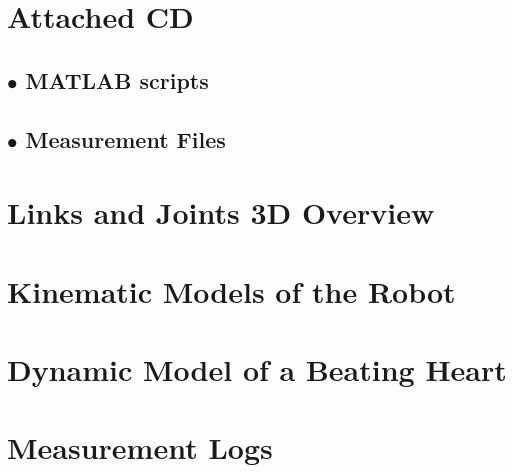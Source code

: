 \begin{appendices}
\appendix
\renewcommand{\appendixname}{Appendix}
\renewcommand{\appendixtocname}{Appendix}

\chapter{Attached CD}\label{app:cd}
   \section*{$\bullet$ MATLAB scripts}
   \section*{$\bullet$ Measurement Files}



\chapter{Links and Joints 3D Overview}\label{app:links_joints_3d}


\chapter{Kinematic Models of the Robot}\label{app:kinematic_model_robot}


\chapter{Dynamic Model of a Beating Heart}\label{app:dynamic_model_heart}


\chapter{Measurement Logs}\label{app:meas}




\end{appendices}
